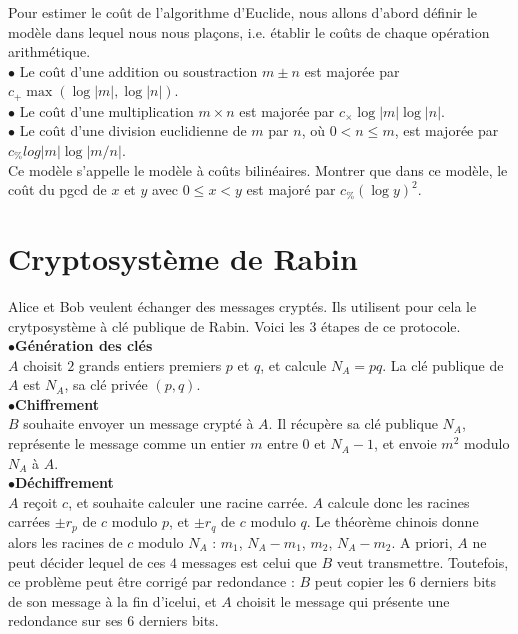 \begin{enumerate}
Pour estimer le coût de l'algorithme d'Euclide, nous allons d'abord définir le modèle dans lequel nous nous plaçons, i.e. établir le coûts de chaque opération arithmétique. \\

$\bullet$ Le coût d'une addition ou soustraction $m\pm n$ est majorée par $c_+ \max(\log|m|,\log |n|)$.\\
$\bullet$ Le coût d'une multiplication $m\times n$ est majorée par $c_\times \log |m| \log |n|$.\\
$\bullet$ Le coût d'une division euclidienne de $m$ par $n$, où $0<n\leq m$, est majorée par $c_\% log|m|\log |m/n|$.\\

Ce modèle s'appelle le modèle à coûts bilinéaires. Montrer que dans ce modèle, le coût du pgcd de $x$ et $y$ avec $0\leq x< y$ est majoré par $c_\% (\log y )^2$.
\end{enumerate}

\section{Cryptosystème de Rabin}

Alice et Bob veulent échanger des messages cryptés. Ils utilisent pour cela le crytposystème à clé publique de Rabin. Voici les $3$ étapes de ce protocole.\\

$\bullet$\textbf{Génération des clés}\\
$A$ choisit $2$ grands entiers premiers $p$ et $q$, et calcule $N_A=pq$. La clé publique de $A$ est $N_A$, sa clé privée $(p,q)$.  \\

$\bullet$\textbf{Chiffrement}\\
$B$ souhaite envoyer un message crypté à $A$. Il récupère sa clé publique $N_A$, représente le message comme un entier $m$ entre $0$ et $N_A-1$, et envoie $m^2 $ modulo $N_A$ à $A$.\\

$\bullet$\textbf{Déchiffrement}\\
$A$ reçoit $c$, et souhaite calculer une racine carrée. $A$ calcule donc les racines carrées  $\pm r_p$ de $c$ modulo $p$, et  $\pm r_q$ de $c$ modulo $q$. Le théorème chinois donne alors les racines de $c$ modulo $N_A$ : $m_1$, $N_A-m_1$, $m_2$, $N_A-m_2$. A priori, $A$ ne peut décider lequel de ces $4$ messages est celui que $B$ veut transmettre. Toutefois, ce problème peut être corrigé par redondance : $B$ peut copier les $6$ derniers bits de son message à la fin d'icelui, et $A$ choisit le message qui présente une redondance sur ses $6$ derniers bits.\\

